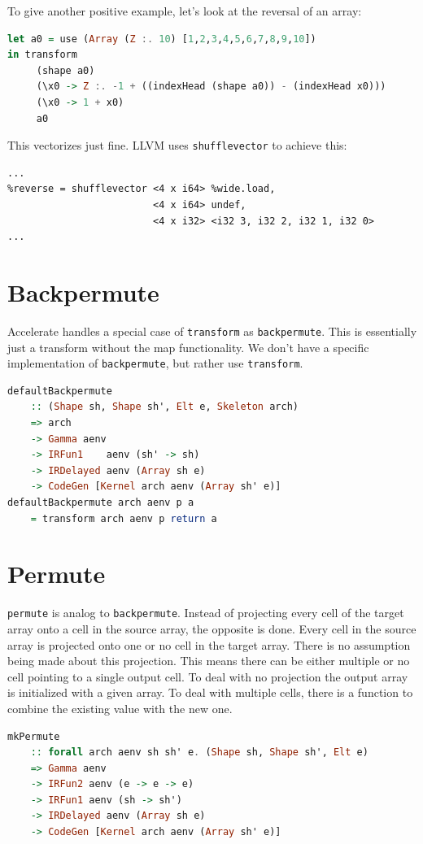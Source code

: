 \documentclass[a4paper,bibliography=totocnumbered,parskip,headsepline]{scrbook}
\begin{document}
To give another positive example, let's look at the reversal of an array:
\begin{lstlisting}[language=haskell]
let a0 = use (Array (Z :. 10) [1,2,3,4,5,6,7,8,9,10])
in transform
     (shape a0)
     (\x0 -> Z :. -1 + ((indexHead (shape a0)) - (indexHead x0)))
     (\x0 -> 1 + x0)
     a0
\end{lstlisting}
\begin{minipage}{\textwidth}
This vectorizes just fine.
LLVM uses \lstinline{shufflevector} to achieve this:
\begin{lstlisting}
...
%reverse = shufflevector <4 x i64> %wide.load,
                         <4 x i64> undef,
                         <4 x i32> <i32 3, i32 2, i32 1, i32 0>
...
\end{lstlisting}
\end{minipage}

\section{Backpermute}
Accelerate handles a special case of \lstinline[language=haskell]!transform! as \lstinline[language=haskell]!backpermute!.
This is essentially just a transform without the map functionality.
We don't have a specific implementation of \lstinline[language=haskell]!backpermute!, but rather use \lstinline[language=haskell]!transform!.
\begin{lstlisting}[language=haskell]
defaultBackpermute
    :: (Shape sh, Shape sh', Elt e, Skeleton arch)
    => arch
    -> Gamma aenv
    -> IRFun1    aenv (sh' -> sh)
    -> IRDelayed aenv (Array sh e)
    -> CodeGen [Kernel arch aenv (Array sh' e)]
defaultBackpermute arch aenv p a
    = transform arch aenv p return a
\end{lstlisting}

\section{Permute}
\lstinline[language=haskell]!permute! is analog to \lstinline[language=haskell]!backpermute!.
Instead of projecting every cell of the target array onto a cell in the source array, the opposite is done.
Every cell in the source array is projected onto one or no cell in the target array.
There is no assumption being made about this projection.
This means there can be either multiple or no cell pointing to a single output cell.
To deal with no projection the output array is initialized with a given array.
To deal with multiple cells, there is a function to combine the existing value with the new one.
\begin{lstlisting}[language=haskell]
mkPermute
    :: forall arch aenv sh sh' e. (Shape sh, Shape sh', Elt e)
    => Gamma aenv
    -> IRFun2 aenv (e -> e -> e)
    -> IRFun1 aenv (sh -> sh')
    -> IRDelayed aenv (Array sh e)
    -> CodeGen [Kernel arch aenv (Array sh' e)]
\end{lstlisting}
\end{document}
